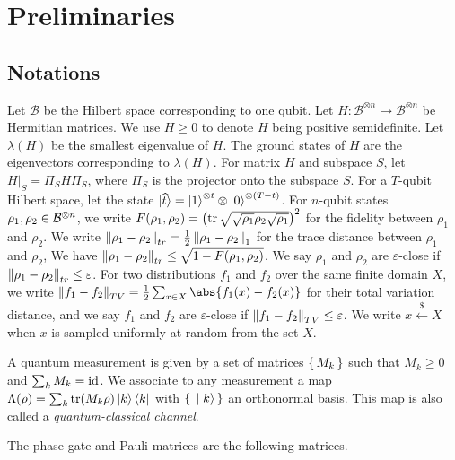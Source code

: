 \section{Preliminaries}


\subsection{Notations}

Let $\mathcal{B}$ be the Hilbert space corresponding to one qubit. Let $H:\mathcal{B}^{\otimes n}\rightarrow\mathcal{B}^{\otimes n}$ be Hermitian matrices. We use $H\geq0$ to denote $H$ being positive semidefinite. Let $\lambda(H)$ be the smallest eigenvalue of $H$. The ground states of $H$ are the eigenvectors corresponding to $\lambda(H)$. For matrix $H$ and subspace $S$, let $H\big|_S=\Pi_S H \Pi_S$, where $\Pi_S$ is the projector onto the subspace $S$. For a $T$-qubit Hilbert space, let the state $\ket{\widehat{t}}=\ket{1}^{\otimes t}\otimes \ket{0}^{{\otimes (T-t)}}$.
For $n$-qubit states $\rho_1, \rho_2\in\mathcal{B}^{\otimes n}$,
we write $F(\rho_1, \rho_2)=\left(\operatorname{tr}\sqrt{\sqrt{\rho_1}\rho_2\sqrt{\rho_1}}\right)^2$ for the fidelity between $\rho_1$ and $\rho_2$.
We write $\left\lVert\rho_1-\rho_2\right\rVert_{tr}=\frac{1}{2}\left\lVert\rho_1-\rho_2\right\rVert_1$ for the trace distance between $\rho_1$ and $\rho_2$,
We have $\left\lVert\rho_1-\rho_2\right\rVert_{tr}\leq\sqrt{1-F(\rho_1, \rho_2)}$.
We say $\rho_1$ and $\rho_2$ are $\varepsilon$-close if $\left\lVert\rho_1- \rho_2\right\rVert_{tr}\leq\varepsilon$.
For two distributions $f_1$ and $f_2$ over the same finite domain $X$, we write $\norm{f_1-f_2}_{TV}=\frac{1}{2}\sum_{x\in X}\abs{f_1(x)-f_2(x)}$ for their total variation distance,
and we say $f_1$ and $f_2$ are $\varepsilon$-close if $\left\lVert f_1-f_2\right\rVert_{TV}\leq\varepsilon$.
We write $x\xleftarrow{\$}X$ when $x$ is sampled uniformly at random from the set $X$.

\begin{definition} 
	\label{def:QCChannel}
	A quantum measurement is given by a set of matrices $\set{M_k}$ such that $M_k\geq0$ and $\sum_k M_k=\operatorname{id}$.
	We associate to any measurement a map $\Lambda(\rho)=\sum_k \operatorname{tr}(M_k\rho)\ket{k}\bra{k}$
	with $\set{\ket{k}}$ an orthonormal basis.
	This map is also called a \emph{quantum-classical channel}.
\end{definition}

The phase gate and Pauli matrices are the following matrices.

